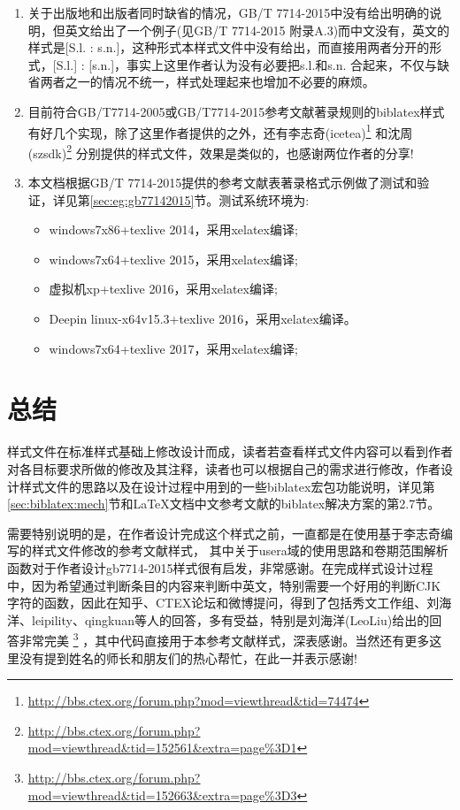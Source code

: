 \begin{enumerate}
  \item 关于出版地和出版者同时缺省的情况，GB/T 7714-2015中没有给出明确的说明，但英文给出了一个例子(见GB/T 7714-2015 附录A.3)而中文没有，英文的样式是[S.l. : s.n.]，这种形式本样式文件中没有给出，而直接用两者分开的形式，[S.l.] : [s.n.]，事实上这里作者认为没有必要把s.l.和s.n. 合起来，不仅与缺省两者之一的情况不统一，样式处理起来也增加不必要的麻烦。

  \item 目前符合GB/T7714-2005或GB/T7714-2015参考文献著录规则的biblatex样式有好几个实现，除了这里作者提供的之外，还有李志奇(icetea)\footnote{\url{http://bbs.ctex.org/forum.php?mod=viewthread&tid=74474}} 和沈周(szsdk)\footnote{\url{http://bbs.ctex.org/forum.php?mod=viewthread&tid=152561&extra=page\%3D1}} 分别提供的样式文件，效果是类似的，也感谢两位作者的分享!

  \item 本文档根据GB/T 7714-2015提供的参考文献表著录格式示例做了测试和验证，详见第\ref{sec:eg:gb77142015}节。测试系统环境为:
    \begin{itemize}
    \item windows7x86+texlive 2014，采用xelatex编译;

    \item windows7x64+texlive 2015，采用xelatex编译;

    \item 虚拟机xp+texlive 2016，采用xelatex编译;

    \item Deepin linux-x64v15.3+texlive 2016，采用xelatex编译。

    \item windows7x64+texlive 2017，采用xelatex编译;
    \end{itemize}

\end{enumerate}


\section{总结}

样式文件在标准样式基础上修改设计而成，读者若查看样式文件内容可以看到作者对各目标要求所做的修改及其注释，读者也可以根据自己的需求进行修改，作者设计样式文件的思路以及在设计过程中用到的一些biblatex宏包功能说明，详见第\ref{sec:biblatex:mech}节和LaTeX文档中文参考文献的biblatex解决方案的第2.7节。

需要特别说明的是，在作者设计完成这个样式之前，一直都是在使用基于李志奇编写的样式文件修改的参考文献样式，
其中关于usera域的使用思路和卷期范围解析函数对于作者设计gb7714-2015样式很有启发，非常感谢。在完成样式设计过程中，因为希望通过判断条目的内容来判断中英文，特别需要一个好用的判断CJK字符的函数，因此在知乎、CTEX论坛和微博提问，得到了包括秀文工作组、刘海洋、leipility、qingkuan等人的回答，多有受益，特别是刘海洋(LeoLiu)给出的回答非常完美
\footnote{\url{http://bbs.ctex.org/forum.php?mod=viewthread&tid=152663&extra=page\%3D3}}
，其中代码直接用于本参考文献样式，深表感谢。当然还有更多这里没有提到姓名的师长和朋友们的热心帮忙，在此一并表示感谢!



